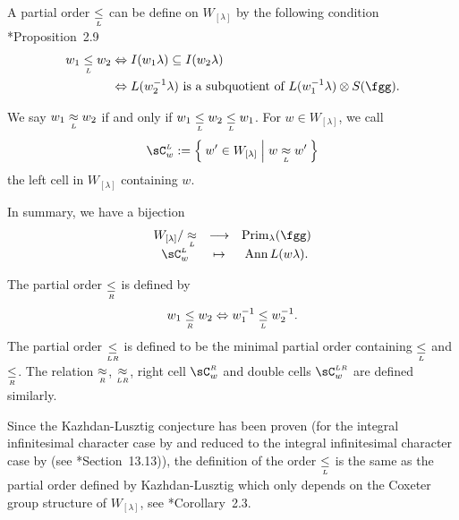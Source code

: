 \documentclass[counting_main.tex]{subfiles}
\begin{document}
A partial order $\mathrel{\mathop{\leq}\limits_{\scriptscriptstyle L}}$ can be define on $W_{[\lambda]}$ by the following
condition \cite{BV2}*{Proposition~2.9}
\begin{equation}\label{eq:leqL}
  \begin{split}
    w_{1} \leqL w_{2} & \Leftrightarrow
    I(w_{1}\lambda)\subseteq I(w_{2}\lambda)\\
    & \Leftrightarrow
    L(w_{2}^{-1}\lambda) \text{ is a subquotient of
    } L(w_{1}^{-1}\lambda)\otimes S(\fgg).
  \end{split}
\end{equation}

We say $w_{1} \mathrel{\mathop{\approx}\limits_{\scriptscriptstyle L}} w_{2}$ if and only if $w_{1}\mathrel{\mathop{\leq}\limits_{\scriptscriptstyle L}} w_{2}\mathrel{\mathop{\leq}\limits_{\scriptscriptstyle L}} w_{1}$. For
$w\in W_{[\lambda]}$, we call
\[
  \CL_{w} := \Set{ w' \in W_{[\lambda]}| w\approxL w'}
\]
the left cell in $W_{[\lambda]}$ containing $w$.

In summary, we have a bijection
\[
  \begin{array}{ccc}
    W_{[\lambda]}/ \approxL &\longrightarrow & \Prim_{\lambda}(\fgg)\\
    \CL_{w} & \mapsto & \Ann L(w\lambda).
  \end{array}
\]



The partial order $\mathrel{\mathop{\leq}\limits_{\scriptscriptstyle R}}$ is defined by
\[
  w_{1}\mathrel{\mathop{\leq}\limits_{\scriptscriptstyle R}} w_{2} \Leftrightarrow w_{1}^{-1} \mathrel{\mathop{\leq}\limits_{\scriptscriptstyle L}} w_{2}^{-1}.
\]
The partial order $\mathrel{\mathop{\leq}\limits_{\scriptscriptstyle LR}}$ is defined to be the minimal partial order containing
$\mathrel{\mathop{\leq}\limits_{\scriptscriptstyle L}}$ and $\mathrel{\mathop{\leq}\limits_{\scriptscriptstyle R}}$. The relation $\mathrel{\mathop{\approx}\limits_{\scriptscriptstyle R}}$, $\mathrel{\mathop{\approx}\limits_{\scriptscriptstyle LR}}$, right cell $\CR_{ w}$
and double cells $\CLR_{w}$ are defined similarly.

Since the Kazhdan-Lusztig conjecture has been proven (for the integral
infinitesimal character case by \cite{BB,BK} and reduced to the integral
infinitesimal character case by \cite{Soergel} (see \cite{H}*{Section~13.13})),
the definition of the order $\mathrel{\mathop{\leq}\limits_{\scriptscriptstyle L}}$ is the same as the partial order defined by
Kazhdan-Lusztig \cite{KL} which only depends on the Coxeter group structure of
$W_{[\lambda]}$, see \cite{BV2}*{Corollary~2.3}. 
\end{document}
